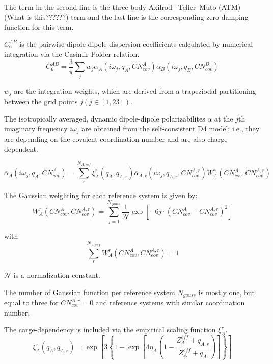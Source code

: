 \vspace{10pt}
\noindent
The term in the second line is the three-body Axilrod–
Teller–Muto (ATM) (What is this??????) term and the last line is the corresponding zero-damping function for this term.


\vspace{10pt}
\noindent
\(C_6^{AB}\) is the pairwise dipole-dipole dispersion coefficients calculated by numerical integration via the Casimir-Polder relation.
\begin{equation}
  C_6^{AB} = \frac{3}{\pi} \sum_{j} w_j \overline{\alpha}_A (i\omega_j, q_A, CN_{cov}^A)\overline{\alpha}_B (i\omega_j, q_B, CN_{cov}^B)
\end{equation}

\noindent
\(w_j\) are the integration weights, which are derived from a trapeziodal partitioning between the grid points \(j(j \in [1,23])\).

\noindent
The isotropically averaged, dynamic dipole-dipole polarizabilites \(\overline{\alpha}\) at the \(j\)th imaginary frequency \(i\omega_j\) are obtained from the self-consistent D4 model; i.e., they are depending on the covalent coordination number and are also charge dependent.

\begin{equation}
  \overline{\alpha}_A(i\omega_j, q_A, CN_{cov}^A) = \sum_{r}^{N_{A,ref}} \xi_A^r (q_A, q_{A,r}) \overline{\alpha}_{A,r}(i\omega_j, q_{A,r}, CN_{cov}^{A,r}) W_A^r(CN_{cov}^A, CN_{cov}^{A,r})
\end{equation}

\noindent
The Gaussian weighting for each reference system is given by:
\begin{equation}
  W_A^r(CN_{cov}^A, CN_{cov}^{A,r}) = \sum_{j=1}^{N_{gauss}} \frac{1}{\mathcal{N}} \exp\left[-6j \cdot (CN_{cov}^A - CN_{cov}^{A,r})^2\right]
\end{equation}

with
\begin{equation}
  \sum_{r}^{N_{A,ref}} W_A^r(CN_{cov}^A, CN_{cov}^{A,r}) = 1
\end{equation}

\vspace{10pt}
\noindent
\(\mathcal{N}\) is a normalization constant.

\noindent
The number of Gaussian function per reference system \(N_{gauss}\) is mostly one, but equal to three for \(CN_{cov}^{A,r} = 0\) and reference systems with similar coordination number.

\noindent
The carge-dependency is included via the empirical scaling function \(\xi_A^r\).
\begin{equation}
  \xi_A^r(q_A, q_{A,r}) = \exp\left[3\left\{1-\exp\left[4\eta_A\left(1-\frac{Z_A^{eff} + q_{A,r}}{Z_A^{eff} + q_A}\right)\right]\right\}\right]
\end{equation}

